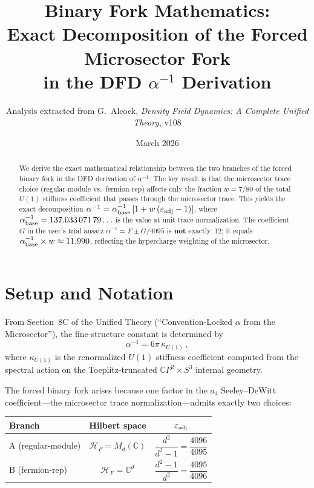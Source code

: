 \documentclass[12pt,a4paper]{article}
\title{Binary Fork Mathematics:\\[6pt]
\large Exact Decomposition of the Forced Microsector Fork\\
in the DFD $\alpha^{-1}$ Derivation}
\author{Analysis extracted from G.\ Alcock, \textit{Density Field Dynamics:
A Complete Unified Theory}, v108}
\date{March 2026}
\begin{document}
\maketitle

\begin{abstract}
We derive the exact mathematical relationship between the two branches
of the forced binary fork in the DFD derivation of $\alpha^{-1}$.
The key result is that the microsector trace choice (regular-module vs.\
fermion-rep) affects only the fraction $w = 7/80$ of the total
$U(1)$ stiffness coefficient that passes through the microsector trace.
This yields the exact decomposition
$\alpha^{-1} = \alpha^{-1}_{\rm base}\,[1 + w\,(\varepsilon_{\rm adj} - 1)]$,
where $\alpha^{-1}_{\rm base} = 137.033\,071\,79\ldots$ is the value at
unit trace normalization. The coefficient $G$ in the user's trial ansatz
$\alpha^{-1} = F \pm G/4095$ is \textbf{not} exactly~12; it equals
$\alpha^{-1}_{\rm base} \times w \approx 11.990$, reflecting the
hypercharge weighting of the microsector.
\end{abstract}

\tableofcontents
\newpage

\section{Setup and Notation}

From Section~8C of the Unified Theory (``Convention-Locked $\alpha$ from
the Microsector''), the fine-structure constant is determined by
\begin{equation}\label{eq:master}
\alpha^{-1} = 6\pi\,\kappa_{U(1)}\,,
\end{equation}
where $\kappa_{U(1)}$ is the renormalized $U(1)$ stiffness coefficient
computed from the spectral action on the Toeplitz-truncated
$\mathbb{C}P^2 \times S^3$ internal geometry.

The forced binary fork arises because one factor in the $a_4$
Seeley--DeWitt coefficient---the microsector trace normalization---admits
exactly two choices:

\begin{center}
\renewcommand{\arraystretch}{1.3}
\begin{tabular}{lcc}
\toprule
Branch & Hilbert space & $\varepsilon_{\rm adj}$ \\
\midrule
A (regular-module) & $\mathcal{H}_F = M_d(\mathbb{C})$
  & $\dfrac{d^2}{d^2-1} = \dfrac{4096}{4095}$ \\[8pt]
B (fermion-rep) & $\mathcal{H}_F = \mathbb{C}^d$
  & $\dfrac{d^2-1}{d^2} = \dfrac{4095}{4096}$ \\
\bottomrule
\end{tabular}
\end{center}
\end{document}
